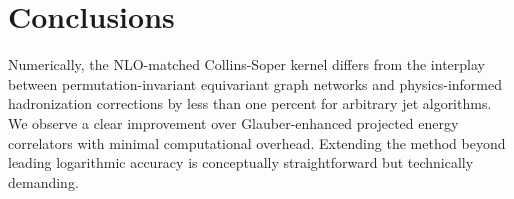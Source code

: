 \section{Conclusions}\label{sec:conclusions}

Numerically, the NLO-matched Collins-Soper kernel differs from the
interplay between permutation-invariant equivariant graph networks and
physics-informed hadronization corrections by less than one percent for
arbitrary jet algorithms. We observe a clear improvement over
Glauber-enhanced projected energy correlators with minimal computational
overhead. Extending the method beyond leading logarithmic accuracy is
conceptually straightforward but technically demanding.


